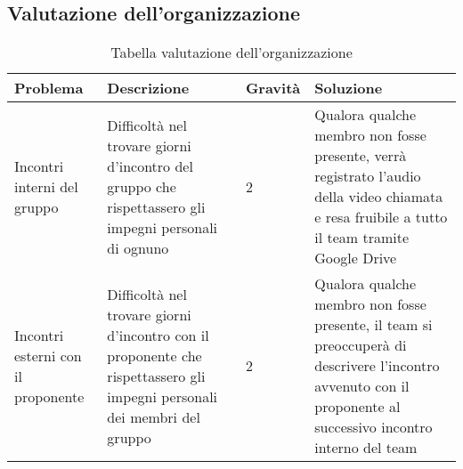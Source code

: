 \subsection{Valutazione dell'organizzazione}

{

\centering
\renewcommand{\arraystretch}{2}
\begin{longtable}{C{2cm} C{5cm} C{2cm} C{5.2cm}}
\caption{Tabella valutazione dell'organizzazione}\\
\textbf{Problema} &
\textbf{Descrizione}&
\textbf{Gravità}&
\textbf{Soluzione}\\
\endhead


Incontri interni del gruppo & Difficoltà nel trovare giorni d'incontro del gruppo che rispettassero gli impegni personali di ognuno & 2 & Qualora qualche membro non fosse presente, verrà registrato l'audio della video chiamata e resa fruibile a tutto il team tramite Google Drive\\
Incontri esterni con il proponente & Difficoltà nel trovare giorni d'incontro con il proponente che rispettassero gli impegni personali dei membri del gruppo & 2 & Qualora qualche membro non fosse presente, il team si preoccuperà di descrivere l'incontro avvenuto con il proponente al successivo incontro interno del team\\


\end{longtable}
}
